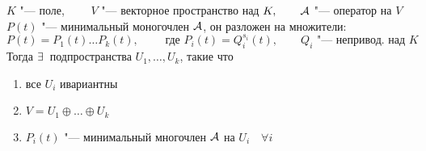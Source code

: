 \begin{theorem}
	$ K $ "--- поле, $ \qquad V $ "--- векторное пространство над $ K, \qquad \mathcal{A} $ "--- оператор на $ V $ \\
	$ P(t) $ "--- минимальный моногочлен $ \mathcal{A} $, он разложен на множители:
	$$ P(t) = P_1(t) \dots P_k(t), \qquad \text{ где } P_i(t) = Q_i^{s_i}(t), \qquad Q_i \text{ "--- непривод. над } K $$
	Тогда $ \exists\, $ подпространства $ U_1, \dots, U_k $, такие что
	\begin{enumerate}
		\item все $ U_i $ ивариантны
		\item $ V = U_1 \oplus \dots \oplus U_k $
		\item $ P_i(t) $ "--- минимальный многочлен $ \mathcal{A} $ на $ U_i \quad \forall i $
	\end{enumerate}
\end{theorem}

